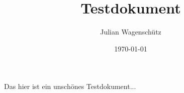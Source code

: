 \documentclass[12pt]{scrartcl}
\title{Testdokument}
\author{Julian Wagenschütz}
\date{\today}
\begin{document}
\maketitle

Das hier ist ein unschönes Testdokument...
\end{document}
